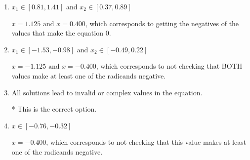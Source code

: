\documentclass{extbook}[14pt]
\begin{document}
\begin{enumerate}
{\begin{enumerate}[label=\Alph*.]
$x = -1.125$, which corresponds to not checking that this value makes at least one of the radicands negative.
\item \( x_1 \in [0.81, 1.41] \text{ and } x_2 \in [0.37,0.89] \)

$x = 1.125 \text{ and } x = 0.400$, which corresponds to getting the negatives of the values that make the equation 0.
\item \( x_1 \in [-1.53, -0.98] \text{ and } x_2 \in [-0.49,0.22] \)

$x = -1.125 \text{ and } x = -0.400$, which corresponds to not checking that BOTH values make at least one of the radicands negative.
\item \( \text{All solutions lead to invalid or complex values in the equation.} \)

* This is the correct option.
\item \( x \in [-0.76,-0.32] \)

$x = -0.400$, which corresponds to not checking that this value makes at least one of the radicands negative.
\end{enumerate}

}
\end{enumerate}
\end{document}
